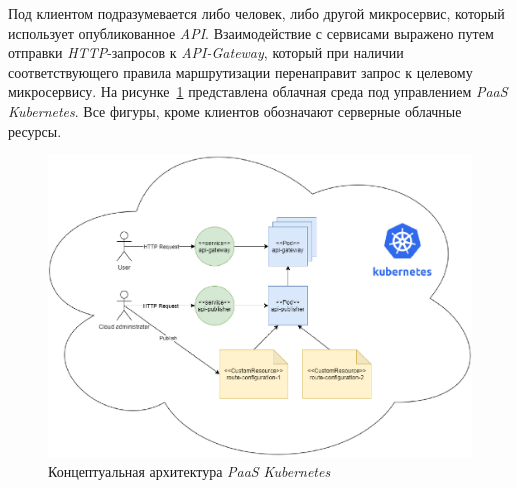 Под клиентом подразумевается либо человек, либо другой микросервис, который использует опубликованное \textit{API}. Взаимодействие с сервисами выражено путем отправки \textit{HTTP}-запросов к \textit{API-Gateway}, который при наличии соответствующего правила маршрутизации перенаправит запрос к целевому микросервису. На рисунке~\ref{fig:kubernetes-conceptual-architecture} представлена облачная среда под управлением \textit{PaaS} \textit{Kubernetes}. Все фигуры, кроме клиентов обозначают серверные облачные ресурсы. 

\begin{figure}[h]
\centering
    \includegraphics[width=0.8\linewidth]{assets/kubernetes-conceptual-architecture.png}
    \caption{Концептуальная архитектура \textit{PaaS} \textit{Kubernetes}}
    \label{fig:kubernetes-conceptual-architecture}
\end{figure}
